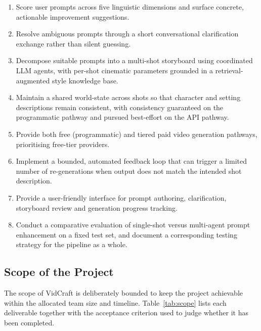 \documentclass[11pt,a4paper]{article}
\begin{document}
\begin{enumerate}[leftmargin=*]
\item Score user prompts across five linguistic dimensions and surface concrete, actionable improvement suggestions.
\item Resolve ambiguous prompts through a short conversational clarification exchange rather than silent guessing.
\item Decompose suitable prompts into a multi-shot storyboard using coordinated LLM agents, with per-shot cinematic parameters grounded in a retrieval-augmented style knowledge base.
\item Maintain a shared world-state across shots so that character and setting descriptions remain consistent, with consistency guaranteed on the programmatic pathway and pursued best-effort on the API pathway.
\item Provide both free (programmatic) and tiered paid video generation pathways, prioritising free-tier providers.
\item Implement a bounded, automated feedback loop that can trigger a limited number of re-generations when output does not match the intended shot description.
\item Provide a user-friendly interface for prompt authoring, clarification, storyboard review and generation progress tracking.
\item Conduct a comparative evaluation of single-shot versus multi-agent prompt enhancement on a fixed test set, and document a corresponding testing strategy for the pipeline as a whole.
\end{enumerate}

\subsection{Scope of the Project}

The scope of VidCraft is deliberately bounded to keep the project achievable within the allocated team size and timeline. Table~\ref{tab:scope} lists each deliverable together with the acceptance criterion used to judge whether it has been completed.
\end{document}
